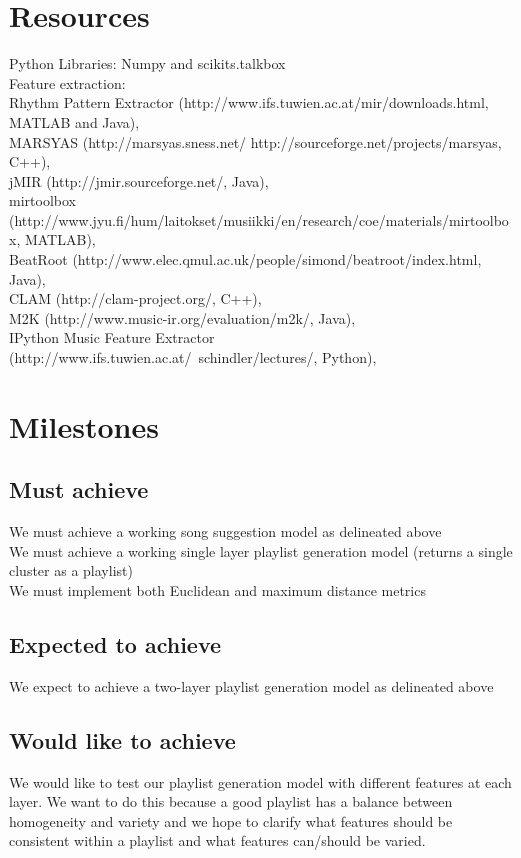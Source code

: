 \documentclass[11pt]{article}
\begin{document}
\section{Resources}
Python Libraries: Numpy and scikits.talkbox\\
Feature extraction:\\
Rhythm Pattern Extractor (http://www.ifs.tuwien.ac.at/mir/downloads.html,
MATLAB and Java),\\
MARSYAS (http://marsyas.sness.net/ http://sourceforge.net/projects/marsyas, C++),\\
jMIR (http://jmir.sourceforge.net/, Java),\\
mirtoolbox (http://www.jyu.fi/hum/laitokset/musiikki/en/research/coe/materials/mirtoolbox, MATLAB),\\
BeatRoot (http://www.elec.qmul.ac.uk/people/simond/beatroot/index.html, Java),\\
CLAM (http://clam-project.org/, C++),\\
M2K (http://www.music-ir.org/evaluation/m2k/, Java),\\
IPython Music Feature Extractor
(http://www.ifs.tuwien.ac.at/~schindler/lectures/, Python),\\






\section{Milestones}
\subsection{Must achieve}
We must achieve a working song suggestion model as delineated above\\
We must achieve a working single layer playlist generation model (returns a single cluster as a playlist)\\
We must implement both Euclidean and maximum distance metrics\\
\subsection{Expected to achieve}
We expect to achieve a two-layer playlist generation model as delineated above\\
\subsection{Would like to achieve}
We would like to test our playlist generation model with different features at each layer. We want to do this because a good playlist has a balance between homogeneity and variety and we hope to clarify what features should be consistent within a playlist and what features can/should be varied.\\
\end{document}
